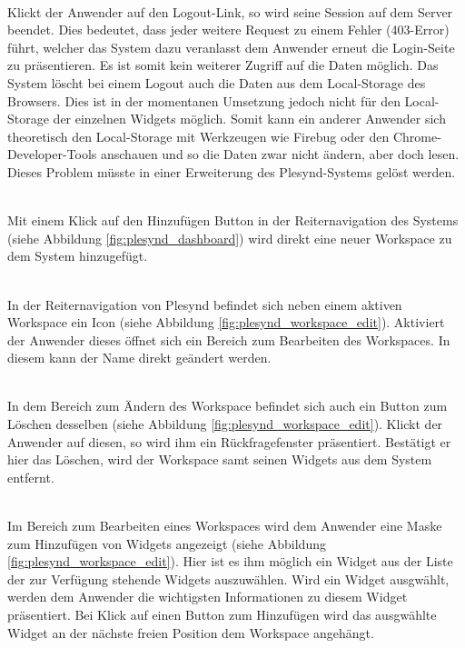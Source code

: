 \textbullet{}  \emph{\requirementKeinZugriffNachLogout}\\
Klickt der Anwender auf den Logout-Link, so wird seine Session auf dem Server beendet. Dies bedeutet, dass jeder weitere Request zu einem Fehler (403-Error) führt, welcher das System dazu veranlasst dem Anwender erneut die Login-Seite zu präsentieren. Es ist somit kein weiterer Zugriff auf die Daten möglich. Das System löscht bei einem Logout auch die Daten aus dem Local-Storage des Browsers. Dies ist in der momentanen Umsetzung jedoch nicht für den Local-Storage der einzelnen Widgets möglich. Somit kann ein anderer Anwender sich theoretisch den Local-Storage mit Werkzeugen wie Firebug oder den Chrome-Developer-Tools anschauen und so die Daten zwar nicht ändern, aber doch lesen. Dieses Problem müsste in einer Erweiterung des Plesynd-Systems gelöst werden.

\textbullet{}  \emph{\requirementWorkspaceAdd}\\
Mit einem Klick auf den Hinzufügen Button in der Reiternavigation des Systems (siehe Abbildung \ref{fig:plesynd_dashboard}) wird direkt eine neuer Workspace zu dem System hinzugefügt.

\textbullet{}  \emph{\requirementWorkspaceEdit}\\
In der Reiternavigation von Plesynd befindet sich neben einem aktiven Workspace ein Icon (siehe Abbildung \ref{fig:plesynd_workspace_edit}). Aktiviert der Anwender dieses öffnet sich ein Bereich zum Bearbeiten des Workspaces. In diesem kann der Name direkt geändert werden.

\textbullet{}  \emph{\requirementWorkspaceDelete}\\
In dem Bereich zum Ändern des Workspace befindet sich auch ein Button zum Löschen desselben (siehe Abbildung \ref{fig:plesynd_workspace_edit}). Klickt der Anwender auf diesen, so wird ihm ein Rückfragefenster präsentiert. Bestätigt er hier das Löschen, wird der Workspace samt seinen Widgets aus dem System entfernt. 

\textbullet{}  \emph{\requirementWidgetAdd}\\
Im Bereich zum Bearbeiten eines Workspaces wird dem Anwender eine Maske zum Hinzufügen von Widgets angezeigt (siehe Abbildung \ref{fig:plesynd_workspace_edit}). Hier ist es ihm möglich ein Widget aus der Liste der zur Verfügung stehende Widgets auszuwählen. Wird ein Widget ausgwählt, werden dem Anwender die wichtigsten Informationen zu diesem Widget präsentiert. Bei Klick auf einen Button zum Hinzufügen wird das ausgwählte Widget an der nächste freien Position dem Workspace angehängt.

